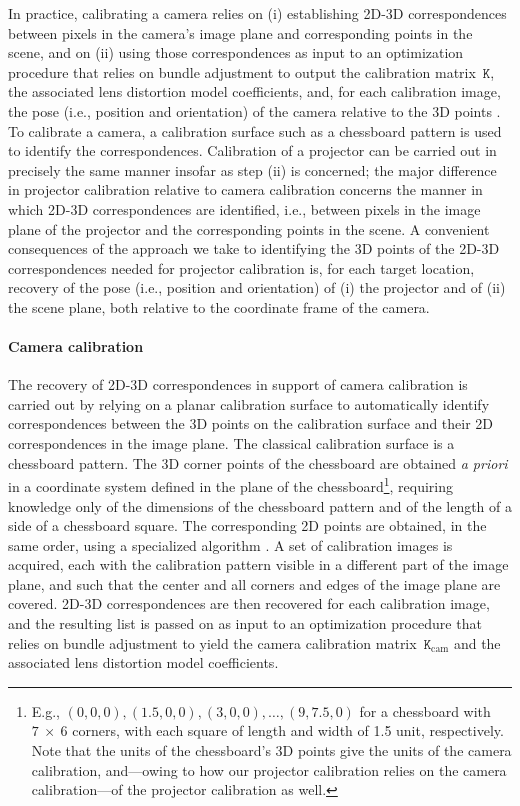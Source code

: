 \documentclass[review]{elsarticle}
\begin{document}
In practice, calibrating a camera relies on (i) establishing 2D-3D correspondences between pixels in the camera's image plane and corresponding points in the scene, and on (ii) using those correspondences as input to an optimization procedure that relies on bundle adjustment \cite{triggs1999bundle} to output the calibration matrix~$\mathtt{K}$, the associated lens distortion model coefficients, and, for each calibration image, the pose (i.e., position and orientation) of the camera relative to the 3D points \cite{Hartley2004,zhang2000flexible}. To calibrate a camera, a calibration surface such as a chessboard pattern is used to identify the correspondences. Calibration of a projector can be carried out in precisely the same manner insofar as step (ii) is concerned; the major difference in projector calibration relative to camera calibration concerns the manner in which 2D-3D correspondences are identified, i.e., between pixels in the image plane of the projector and the corresponding points in the scene. A convenient consequences of the approach we take to identifying the 3D points of the 2D-3D correspondences needed for projector calibration is, for each target location, recovery of the pose (i.e., position and orientation) of (i) the projector and of (ii) the scene plane, both relative to the coordinate frame of the camera.

\paragraph{Camera calibration} The recovery of 2D-3D correspondences in support of camera calibration is carried out by relying on a planar calibration surface to automatically identify correspondences between the 3D points on the calibration surface and their 2D correspondences in the image plane. The classical calibration surface is a chessboard pattern. The 3D corner points of the chessboard are obtained \textit{a priori} in a coordinate system defined in the plane of the chessboard\footnote{E.g., $(0,0,0), (1.5,0,0), (3,0,0), \dots, (9,7.5,0)$ for a chessboard with $7~\times{}~6$ corners, with each square of length and width of 1.5 unit, respectively. Note that the units of the chessboard's 3D points give the units of the camera calibration, and---owing to how our projector calibration relies on the camera calibration---of the projector calibration as well.}, requiring knowledge only of the dimensions of the chessboard pattern and of the length of a side of a chessboard square. The corresponding 2D points are obtained, in the same order, using a specialized algorithm \cite{bradski2000opencv}. A set of calibration images is acquired, each with the calibration pattern visible in a different part of the image plane, and such that the center and all corners and edges of the image plane are covered. 2D-3D correspondences are then recovered for each calibration image, and the resulting list is passed on as input to an optimization procedure that relies on bundle adjustment to yield the camera calibration matrix~$\mathtt{K}_\text{cam}$ and the associated lens distortion model coefficients. 
\end{document}
